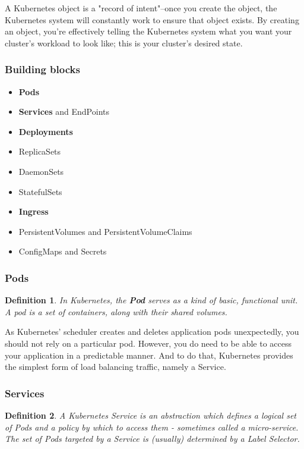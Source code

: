 \documentclass{article}
\newtheorem{theorem}{Definition}[section]
\begin{document}
A Kubernetes object is a "record of intent"–once you create the object, 
the Kubernetes system will constantly work to ensure that object exists. 
By creating an object, you’re effectively telling the Kubernetes system what you want your cluster’s workload to look like; 
this is your cluster’s desired state.

\subsubsection{Building blocks}

\begin{itemize}
    \item \textbf{Pods}
    \item \textbf{Services} and EndPoints
    \item \textbf{Deployments}
    \item ReplicaSets
    \item DaemonSets
    \item StatefulSets
    \item \textbf{Ingress}
    \item PersistentVolumes and PersistentVolumeClaims
    \item ConfigMaps and Secrets
\end{itemize}

\subsubsection{Pods}

\begin{theorem}
    In Kubernetes, the \textbf{Pod} serves as a kind of basic, functional unit. 
    A pod is a set of containers, along with their shared volumes. 
\end{theorem}

As Kubernetes’ scheduler creates and deletes application pods unexpectedly, 
you should not rely on a particular pod. 
However, you do need to be able to access your application in a predictable manner. 
And to do that, Kubernetes provides the simplest form of load balancing traffic, namely a Service.

\subsubsection{Services}

\begin{theorem}
    A Kubernetes Service is an abstraction which defines a logical set 
    of Pods and a policy by which to access them - 
    sometimes called a micro-service. 
    The set of Pods targeted by a Service is (usually) determined by a Label Selector.
\end{theorem}
\end{document}
